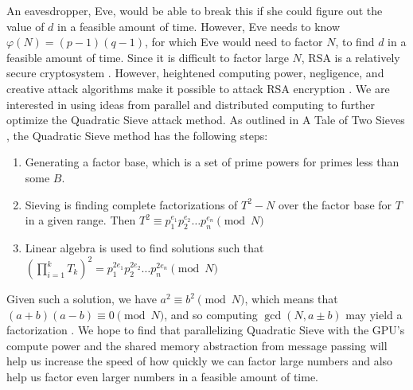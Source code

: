 \documentclass[11pt,twocolumn]{article}
\begin{document}
\indent An eavesdropper, Eve, would be able to break this if she could figure out the value of $d$ in a feasible amount of time. However, Eve needs to know $\varphi(N) = (p-1)(q-1)$, for which Eve would need to factor $N$, to find $d$ in a feasible amount of time. Since it is difficult to factor large $N$, RSA is a relatively secure cryptosystem \cite{hoffstein:cryptography}. However, heightened computing power, negligence, and creative attack algorithms make it possible to attack RSA encryption \cite{lifchitz:rsa_break}. We are interested in using ideas from parallel and distributed computing to further optimize the Quadratic Sieve attack method. As outlined in A Tale of Two Sieves \cite{pomerance:tts}, the Quadratic Sieve method has the following steps:

\begin{enumerate}
    \item Generating a factor base, which is a set of prime powers for primes less than some $B$.
    \item Sieving is finding complete factorizations of $T^2 - N$ over the factor base for $T$ in a given range. Then $T^2 \equiv p_1^{e_1} p_2^{e_2} \ldots p_n^{e_n} \pmod{N}$
    \item Linear algebra is used to find solutions such that $\left( \displaystyle \prod_{i = 1}^k T_k \right)^2 = p_1^{2e_1} p_2^{2e_2} \ldots p_n^{2e_n} \pmod{N}$
\end{enumerate}

Given such a solution, we have $a^2 \equiv b^2 \pmod{N} $, which means that $(a+b)(a-b) \equiv 0 \pmod{N}$, and so computing $\gcd(N, a \pm b)$ may yield a factorization \cite{hoffstein:cryptography}. We hope to find that parallelizing Quadratic Sieve with the GPU's compute power and the shared memory abstraction from message passing will help us increase the speed of how quickly we can factor large numbers and also help us factor even larger numbers in a feasible amount of time.
\end{document}
